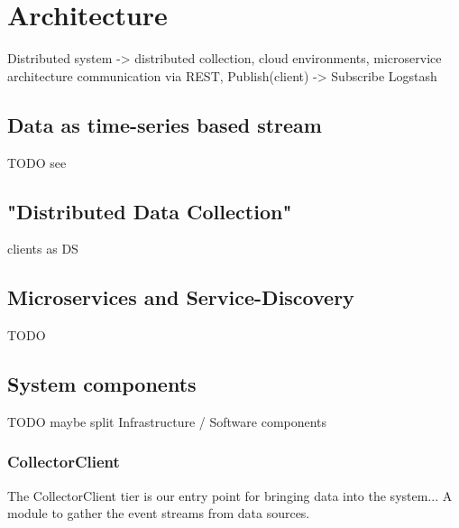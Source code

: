 \chapter{Architecture}

Distributed system -> distributed collection, cloud environments, microservice architecture
communication via REST, Publish(client) -> Subscribe Logstash

%
%
%
%

\section{Data as time-series based stream}

TODO see \cite{Klepp16}

\section{"Distributed Data Collection"}

clients as DS

\section{Microservices and Service-Discovery}

TODO
\section{System components}

TODO maybe split Infrastructure / Software components

\subsection{CollectorClient}

The CollectorClient tier is our entry point for bringing data into the system...
A module to gather the event streams from data sources.

